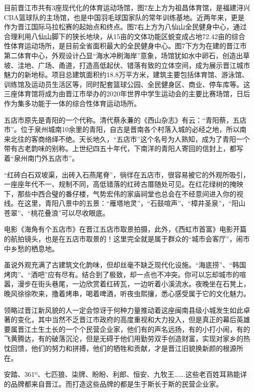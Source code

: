 \documentclass[]{book}
\begin{document}
目前晋江市共有3座现代化的体育运动场馆，图7左上方为祖昌体育馆，是福建浔兴CBA篮球队的主场馆，也是中国羽毛球国家队的常年训练基地。近两年来，更是作为晋江国际马拉松赛的起始点和终点。图7右上方为八仙山全民健身中心，通过合理利用八仙山脚下的狭长地块，从15亩的文体功能区蜕变成占地72.42亩的综合性体育运动场所，是目前全省面积最大的全民健身中心。图7下方为在建的晋江市第二体育中心，外观设计凸显``海水冲刷海岸''意象，场馆犹如水中卵石，创造出草坡、洼地、广场、甬道，打造高低起伏、错落有致的立体空间，成为展示晋江城市魅力的新地标。项目总建筑面积约18.8万平方米，建筑主要包括体育馆、游泳馆、训练馆及运动员生活区等，同时配套篮球公园、全民健身区、商业、停车库等。这三座体育馆将成为由晋江市举办的2020年世界中学生运动会的主要比赛场馆，日后作为集多功能于一体的综合性体育运动场所。

五店市原先是青阳的一个代称。清代蔡永蒹的《西山杂志》有云：``青阳蔡，五店市''。位于泉州城南10余里的青阳，自古是晋南各个村落入城的必经之地，所以南来北往的客商络绎不绝。天长地久，``五店市''这个名号为人熟知，成为了青阳一个带有古老韵味的别称。上世纪四五十年代，下南洋的青阳人寄回的信封上，都写着``泉州南门外五店市''。

``红砖白石双坡渠，出砖入石燕尾脊''，徜徉在五店市，很容易被它的外观所吸引，一座座年代不一、规制不同，高低错落的红砖古厝随处可见。在红花绿树的掩映下，那些中西合璧的番仔楼，气势宏伟的家庙祠堂也总会在不经意间进入你的视线。在这里，青阳八景中的五景：``雁塔地灵''，``石鼓喧声''、``樟井圣泉''，``阳山苍翠''、``桃花叠浪''可以尽收眼底。

电影《海角有个五店市》在晋江五店市取景拍摄，此外，《西虹市首富》电影开篇的航拍镜头，也是在五店市取景的！这里完全就是属于群众的``城市会客厅''，闹市中乡愁的栖息地。

虽说外观充满了古建筑文化韵味，但却丝毫不缺乏现代化设施。``海底捞''、``韩国烤肉''、``酒吧''应有尽有。结合到了极致，却一点也不冲突。你可以忘却城市的喧嚣，漫步在街头巷尾，一边欣赏着红砖瓦，一边听着小溪流水。夜晚坐在石凳上，晚风徐徐吹来，撸着烤串，喝着啤酒，听夜虫熙攘，悉心感受属于它的文化魅力。

领略过晋江新风貌的人一定会惊讶于何种力量推动着这座闽南县级小城发生如此卓著的变化，其中当然不乏晋江市政府的高度重视和大力投入，但是真正的幕后英雄要属晋江土生土长的一个个民营企业家，他们有的声名远扬，有的小打小闹，有的飞黄腾达，有的破落沉沦，但是无碍于他们用勤劳双手创造财富，实现对家乡的热忱回馈，他们的努力和拼搏，他们的牺牲和贡献，才是晋江旧貌换新颜的根源所在。

安踏、361º、七匹狼、柒牌、盼盼、利郎、恒安、九牧王\ldots{}\ldots{}.这些老百姓耳熟能详的品牌都来自晋江。而打造这些品牌的都是生于斯长于斯的民营企业家。
\end{document}
